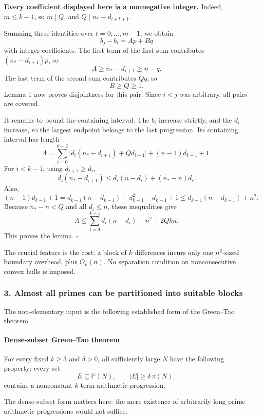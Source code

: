 \documentclass[
  11pt,
  a4paper,
]{article}
\begin{document}
\textbf{Every coefficient displayed here is a nonnegative integer.}
Indeed, \(m\le k-1\), so \(m\mid Q\), and \(Q\mid n_*-d_{i+t+1}\).

Summing these identities over \(t=0,\ldots,m-1\), we obtain \[
b_j-b_i=Ap+Bq
\] with integer coefficients. The first term of the first sum
contributes \((n_*-d_{i+1})p\), so \[
A\ge n_*-d_{i+1}\ge n-q.
\] The last term of the second sum contributes \(Qq\), so \[
B\ge Q\ge1.
\] Lemma 1 now proves disjointness for this pair. Since \(i<j\) was
arbitrary, all pairs are covered.

It remains to bound the containing interval. The \(b_i\) increase
strictly, and the \(d_i\) increase, so the largest endpoint belongs to
the last progression. Its containing interval has length \[
\Lambda
=
\sum_{i=0}^{k-2}
\bigl[d_i(n_*-d_{i+1})+Qd_{i+1}\bigr]
+(n-1)d_{k-1}+1.
\] For \(i<k-1\), using \(d_{i+1}\ge d_i\), \[
d_i(n_*-d_{i+1})
\le d_i(n-d_i)+(n_*-n)d_i.
\] Also, \[
(n-1)d_{k-1}+1
=
d_{k-1}(n-d_{k-1})
+d_{k-1}^2-d_{k-1}+1
\le d_{k-1}(n-d_{k-1})+n^2.
\] Because \(n_*-n<Q\) and all \(d_i\le n\), these inequalities give \[
\Lambda
\le
\sum_{i=0}^{k-1}d_i(n-d_i)+n^2+2Qkn.
\] This proves the lemma. \(\square\)

The crucial feature is the cost: a block of \(k\) differences incurs
only one \(n^2\)-sized boundary overhead, plus \(O_k(n)\). No separation
condition on nonconsecutive convex hulls is imposed.

\subsubsection{3. Almost all primes can be partitioned into suitable
blocks}\label{almost-all-primes-can-be-partitioned-into-suitable-blocks}

The non-elementary input is the following established form of the
Green--Tao theorem.

\paragraph{Dense-subset Green--Tao
theorem}\label{dense-subset-greentao-theorem}

For every fixed \(k\ge3\) and \(\delta>0\), all sufficiently large \(N\)
have the following property: every set \[
E\subseteq\mathbb P(N),
\qquad |E|\ge\delta\,\pi(N),
\] contains a nonconstant \(k\)-term arithmetic progression.

The dense-subset form matters here: the mere existence of arbitrarily
long prime arithmetic progressions would not suffice.
\end{document}
